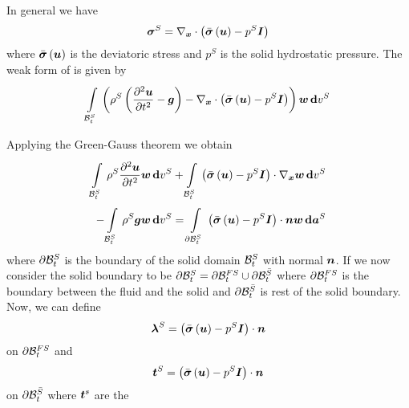 In general we have
\begin{equation}
  \tensor{\sigma}^{S}=\divergence{\vectr{x}}{\pbrac{\fnof{\bar{\tensor{\sigma}}}{\vectr{u}}-p^{S}\matr{I}}}
\end{equation}
where $ \bar{\boldsymbol{\mathit{\sigma}}}\left( \boldsymbol{u} \right) $ is the deviatoric stress and
  $p^{S}$ is the solid hydrostatic pressure. The weak form of
 is given by
\begin{equation}
  \gint{\embedmanifold{B}^{S}_{t}}{}{\pbrac{\rho^{S}\pbrac{\deltwosqby{\vectr{u}}{t}-\vectr{g}}-\divergence{\vectr{x}}{\pbrac{\fnof{\bar{\tensor{\sigma}}}{\vectr{u}}-p^{S}\matr{I}}}}\vectr{w}}{v^{S}}
\end{equation}

Applying the Green-Gauss theorem we obtain
\begin{equation}
  \begin{split}
    \gint{\embedmanifold{B}^{S}_{t}}{}{\rho^{S}\deltwosqby{\vectr{u}}{t}\vectr{w}}{v^{S}}
    +\gint{\embedmanifold{B}^{S}_{t}}{}{\dotprod{\pbrac{\fnof{\bar{\tensor{\sigma}}}{\vectr{u}}-p^{S}\matr{I}}}{\gradient{\vectr{x}}{\vectr{w}}}}{v^{S}} \\
    -\gint{\embedmanifold{B}^{S}_{t}}{}{\rho^{S}\vectr{g}\vectr{w}}{v^{S}}
    =\gint{\boundary{\embedmanifold{B}}^{S}_{t}}{}{\dotprod{\pbrac{\fnof{\bar{\tensor{\sigma}}}{\vectr{u}}-p^{S}\matr{I}}}{\vectr{n}}\vectr{w}}{\covectr{a}^{S}}
  \end{split}
\end{equation}
where $ \partial{\ensuremath{ \mathcal{B} }} ^{S}_{t}$ is the boundary of the solid
domain $ \mathcal{B} ^{S}_{t}$ with normal $\boldsymbol{n}$. If we now consider
the solid boundary to be $ \partial{\ensuremath{ \mathcal{B} }} ^{S}_{t}= \partial{\ensuremath{ \mathcal{B} }} ^{FS}_{t}\cup \partial{\ensuremath{ \mathcal{B} }} ^{\bar{S}}_{t}$
where $ \partial{\ensuremath{ \mathcal{B} }} ^{FS}_{t}$ is the boundary between the fluid and the solid and
$ \partial{\ensuremath{ \mathcal{B} }} ^{\bar{S}}_{t}$ is rest of the solid boundary. Now, we can define
\begin{equation}
  \vectr{\lambda}^{S}=\dotprod{\pbrac{\fnof{\bar{\tensor{\sigma}}}{\vectr{u}}-p^{S}\matr{I}}}{\vectr{n}}
\end{equation}
on $ \partial{\ensuremath{ \mathcal{B} }} ^{FS}_{t}$ and
\begin{equation}
  \vectr{t}^{S}=\dotprod{\pbrac{\fnof{\bar{\tensor{\sigma}}}{\vectr{u}}-p^{S}\matr{I}}}{\vectr{n}}
\end{equation}
on $ \partial{\ensuremath{ \mathcal{B} }} ^{\bar{S}}_{t}$ where $\boldsymbol{t}^{s}$ are the
